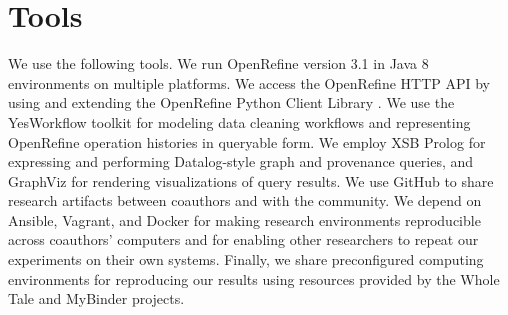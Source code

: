 \section{Tools}

We use the following tools. We run OpenRefine version 3.1 \cite{OpenRefine} in Java 8 environments on multiple platforms. We access the OpenRefine HTTP API by using and extending the OpenRefine Python Client Library \cite{makepeace18ORclient}. We use the YesWorkflow toolkit for modeling data cleaning workflows and representing OpenRefine operation histories in queryable form. We employ XSB Prolog for expressing and performing Datalog-style graph and provenance queries, and GraphViz for rendering visualizations of query results. We use GitHub to share research artifacts between coauthors and with the community. We depend on Ansible, Vagrant, and Docker for making research environments reproducible across coauthors' computers and for enabling other researchers to repeat our experiments on their own systems. Finally, we share preconfigured computing environments for reproducing our results using resources provided by the Whole Tale and MyBinder projects.

